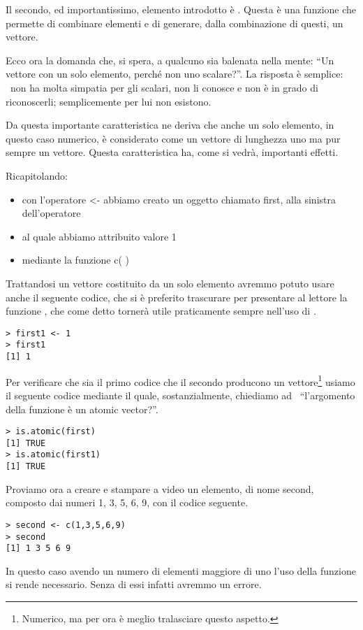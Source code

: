 Il secondo, ed importantissimo, elemento introdotto è . Questa è una funzione che permette di combinare elementi e di generare, dalla combinazione di questi, un vettore.

Ecco ora la domanda che, si spera, a qualcuno sia balenata nella mente: ``Un vettore con un solo elemento, perché non uno scalare?''. La risposta è semplice: \erre\ non ha molta simpatia per gli scalari, non li conosce e non è in grado di riconoscerli; semplicemente per lui non esistono.

Da questa importante caratteristica ne deriva che anche un solo elemento, in questo caso numerico, è considerato come un vettore di lunghezza uno ma pur sempre un vettore. Questa caratteristica ha, come si vedrà, importanti effetti.

Ricapitolando:
\begin{itemize}
\item con l'operatore <- abbiamo creato un oggetto chiamato first, alla sinistra dell'operatore
\item al quale abbiamo attribuito valore 1
\item mediante la funzione c( )
\end{itemize}

Trattandosi un vettore costituito da un solo elemento avremmo potuto usare anche il seguente codice, che si è preferito trascurare per presentare al lettore la funzione , che come detto tornerà utile praticamente sempre nell'uso di \erre.
\begin{lstlisting}
> first1 <- 1
> first1
[1] 1
\end{lstlisting}

Per verificare che sia il primo codice che il secondo producono un vettore\footnote{Numerico, ma per ora è meglio tralasciare questo aspetto.} usiamo il seguente codice mediante il quale, sostanzialmente, chiediamo ad \erre\  ``l'argomento della funzione  è un atomic vector?''.
\begin{lstlisting}
> is.atomic(first)
[1] TRUE
> is.atomic(first1)
[1] TRUE
\end{lstlisting}

Proviamo ora a creare e stampare a video un elemento, di nome second, composto dai numeri 1, 3, 5, 6, 9, con il codice seguente.
\begin{lstlisting}
> second <- c(1,3,5,6,9)
> second
[1] 1 3 5 6 9
\end{lstlisting}

In questo caso avendo un numero di elementi maggiore di uno l'uso della funzione  si rende necessario. Senza di essi infatti avremmo un errore.

